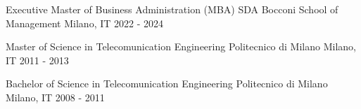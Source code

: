 
\begin{cventries}
  \cventrynodata
    {Executive Master of Business Administration (MBA)} %
    {SDA Bocconi School of Management} %
    {Milano, IT} %
    {2022 - 2024} %
    
  \cventrynodata
    {Master of Science in Telecomunication Engineering} %
    {Politecnico di Milano} %
    {Milano, IT} %
    {2011 - 2013} %
    
  \cventrynodata
    {Bachelor of Science in Telecomunication Engineering} %
    {Politecnico di Milano} %
    {Milano, IT} %
    {2008 - 2011} %
\end{cventries}
